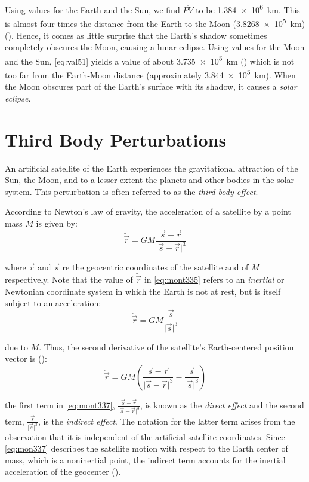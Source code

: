 Using values for the Earth and the Sun, we find \(\overline{PV}\) to 
be \SI{1.384e6}{\km}. This is almost four times the distance from the 
Earth to the Moon (\SI{3.8268e5}{\km}) (\cite{Vallado}). Hence, it comes as little surprise 
that the Earth's shadow sometimes completely obscures the Moon, causing a 
lunar eclipse. Using values for the Moon and the Sun, 
\ref{eq:val51} yields a value of about \SI{3.735e5}{\km} (\cite{Vallado}) 
which is not too far from the Earth-Moon distance (approximately 
\SI{3.844e5}{\km}). When the Moon obscures part of the Earth's surface with its 
shadow, it causes a \emph{solar eclipse}.

\section{Third Body Perturbations}
An artificial satellite of the Earth experiences the gravitational attraction of
the Sun, the Moon, and to a lesser extent the planets and other bodies in the solar 
system. This perturbation is often referred to as the \emph{third-body effect}.

According to Newton's law of gravity, the acceleration of a satellite by a point 
mass \(M\) is given by:
\begin{equation}
  \label{eq:mont335}
  \ddot{\vec{r}} = G M \frac{\vec{s} - \vec{r}}{\lvert \vec{s} - \vec{r} {\rvert}^3}
\end{equation}

where \(\vec{r}\) and \(\vec{s}\) re the geocentric coordinates of the satellite 
and of \(M\) respectively. Note that the value of \(\ddot{\vec{r}}\) in \ref{eq:mont335} 
refers to an \emph{inertial} or Newtonian coordinate system in which the Earth is 
not at rest, but is itself subject to an acceleration:
\begin{equation}
  \ddot{\vec{r}} = G M \frac{\vec{s}}{\lvert \vec{s} {\rvert}^3}
\end{equation}

due to \(M\). Thus, the second derivative of the satellite's Earth-centered position 
vector is (\cite{Montenbruck2000}):
\begin{equation}
  \label{eq:mont337}
  \ddot{\vec{r}} = G M \left( \frac{\vec{s} - \vec{r}}{\lvert \vec{s} - \vec{r} {\rvert}^3} 
   - \frac{\vec{s}}{\lvert \vec{s} {\rvert}^3} \right)
\end{equation}

the first term in \ref{eq:mont337}, \(\frac{\vec{s} - \vec{r}}{\lvert \vec{s} - \vec{r} {\rvert}^3}\), 
is known as the \emph{direct effect} and the second term, \(\frac{\vec{s}}{\lvert \vec{s} {\rvert}^3}\), 
is the \emph{indirect effect}. The notation for the latter term arises from the observation that it
is independent of the artificial satellite coordinates. Since \ref{eq:mon337} describes
the satellite motion with respect to the Earth center of mass, which is a noninertial
point, the indirect term accounts for the inertial acceleration of the geocenter 
(\cite{tapley}). 

